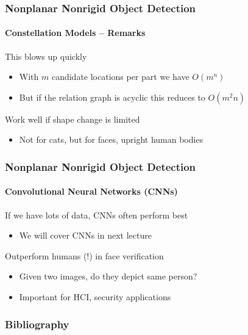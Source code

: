 \documentclass[xetex,professionalfont]{beamer}
\let\oldemph\emph
\renewcommand\emph[1]{\textcolor{tuwcvl_inf_red}{#1}}
\begin{document}

\begin{frame}
\frametitle{Nonplanar Nonrigid Object Detection}
\framesubtitle{Constellation Models -- Remarks}

This blows up quickly
\begin{itemize}
    \item With $m$ candidate locations per part we have $O(m^n)$
    \item But if the relation graph is acyclic this reduces to $O(m^2n)$
\end{itemize}

\bigskip
Work well if shape change is limited
\begin{itemize}
    \item Not for cats, but for faces, upright human bodies
\end{itemize}

\end{frame}


\begin{frame}
\frametitle{Nonplanar Nonrigid Object Detection}
\framesubtitle{Convolutional Neural Networks (CNNs)}

If we have lots of data, CNNs often perform best
\begin{itemize}
    \item We will cover CNNs in next lecture
\end{itemize}

\bigskip
Outperform humans (!) in \emph{face verification}
\begin{itemize}
    \item Given two images, do they depict same person?
    \item Important for HCI, security applications
\end{itemize}

\end{frame}


\renewcommand\emph[1]{\oldemph{#1}}

\begin{frame}[allowframebreaks=0.9]
\frametitle{Bibliography}

\printbibliography

\end{frame}
\end{document}
